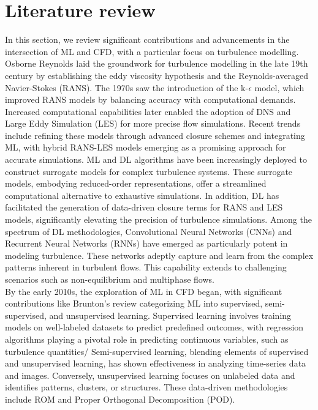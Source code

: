 \section{Literature review}
In this section, we review significant contributions and advancements in the intersection of ML and CFD, with a particular focus on turbulence modelling. Osborne Reynolds laid the groundwork for turbulence modelling in the late 19th century by establishing the eddy viscosity hypothesis and the Reynolds-averaged Navier-Stokes (RANS). The 1970s saw the introduction of the k-$\epsilon$ model, which improved RANS models by balancing accuracy with computational demands. Increased computational capabilities later enabled the adoption of DNS and Large Eddy Simulation (LES) for more precise flow simulations. Recent trends include refining these models through advanced closure schemes and integrating ML, with hybrid RANS-LES models emerging as a promising approach for accurate simulations.
ML and DL algorithms have been increasingly deployed to construct surrogate models for complex turbulence systems. These surrogate models, embodying reduced-order representations, offer a streamlined computational alternative to exhaustive simulations. In addition, DL has facilitated the generation of data-driven closure terms for RANS and LES models, significantly elevating the precision of turbulence simulations. Among the spectrum of DL methodologies, Convolutional Neural Networks (CNNs) and Recurrent Neural Networks (RNNs) have emerged as particularly potent in modeling turbulence. These networks adeptly capture and learn from the complex patterns inherent in turbulent flows. This capability extends to challenging scenarios such as non-equilibrium and multiphase flows. \\   
By the early 2010s, the exploration of ML in CFD began, with significant contributions like Brunton's review \cite{brunton} categorizing ML into supervised, semi-supervised, and unsupervised learning. Supervised learning involves training models on well-labeled datasets to predict predefined outcomes, with regression algorithms playing a pivotal role in predicting continuous variables, such as turbulence quantities/ Semi-supervised learning, blending elements of supervised and unsupervised learning, has shown effectiveness in analyzing time-series data and images. Conversely, unsupervised learning focuses on unlabeled data and identifies patterns, clusters, or structures. These data-driven methodologies include ROM and Proper Orthogonal Decomposition (POD).\\
